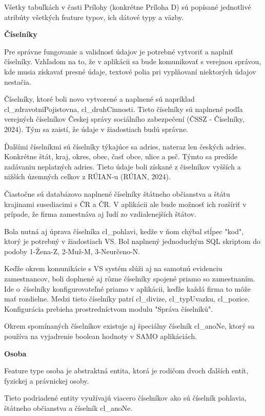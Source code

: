 Všetky tabuľkách v časti Prílohy (konkrétne Príloha D) sú popísané jednotlivé atribúty všetkých feature typov, ich dátové typy a väzby.

\blank
\start\bf Číselníky\stop

Pre správne fungovanie a validnosť údajov je potrebné vytvoriť a naplniť číselníky. Vzhľadom na to, že v aplikácii sa bude komunikovať s verejnou správou, kde musia získavať presné údaje, textové polia pri vyplňovaní niektorých údajov nestačia. 

Číselníky, ktoré boli novo vytvorené a naplnené sú napríklad cl\_zdravotniPojistovna, cl\_druhCinnosti. Tieto číselníky sú naplnené podľa verejných číselníkov Českej správy sociálního zabezpečení \scr(ČSSZ - Číselníky, 2024). Tým sa zaistí, že údaje v žiadostiach budú správne. 

Ďalšími číselníkmi sú číselníky týkajúce sa adries, nateraz len českých adries. Konkrétne štát, kraj, okres, obec, časť obce, ulice a psč. Týmto sa predíde zadávaniu neplatných adries. Tieto údaje boli získané z čiselníkov vyšších a nižších územných celkov z RÚIAN-u \scr(RÚIAN, 2024).

Čiastočne sú databázovo naplnené číselníky štátneho občianstva a štátu krajinami susediacimi s ČR a ČR. V aplikácii ale bude možnosť ich rozšíriť v prípade, že firma zamestnáva aj ľudí zo vzdialenejších štátov.

Bola nutná aj úprava číselníka cl\_pohlavi, kedže v ňom chýbal stĺpec "kod", ktorý je potrebný v žiadostiach VS. Bol naplnený jednoduchým SQL skriptom do podoby 1-Žena-Z, 2-Muž-M, 3-Neurčeno-N.

Keďže okrem komunikácie s VS systém slúži aj na samotnú evidenciu zamestnancov, boli doplnené aj rôzne číselníky spojené priamo so zamestnaním. Ide o~číselníky konfigurovateľné priamo v aplikácii, keďže každá firma to môže mať rozdielne. Medzi tieto číselníky patrí cl\_divize, cl\_typUvazku, cl\_pozice. Konfigurácia prebieha prostredníctvom modulu "Správa číselníků".

Okrem spomínaných číselníkov existuje aj špeciálny číselník cl_anoNe, ktorý sa používa na vyjadrenie boolean hodnoty v SAMO aplikáciách. 

\blank
\start\bf Osoba \stop

Feature type osoba je abstraktná entita, ktorá je rodičom dvoch ďalších entít, fyzickej a právnickej osoby. 

Tieto podriadené entity využívajú viacero číselníkov ako sú číselník pohlavia, štátneho občianstva a číselník cl_anoNe.

